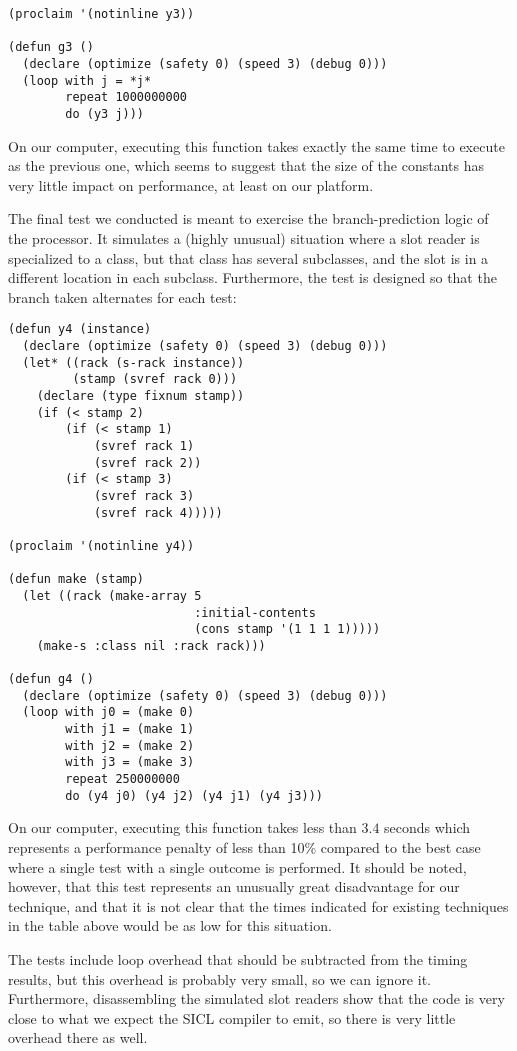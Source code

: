 {{\begin{verbatim}
(proclaim '(notinline y3))

(defun g3 ()
  (declare (optimize (safety 0) (speed 3) (debug 0)))
  (loop with j = *j*
        repeat 1000000000
        do (y3 j)))
\end{verbatim}}

On our computer, executing this function takes exactly the same time to
execute as the previous one, which seems to suggest that the size of
the constants has very little impact on performance, at least on our
platform.

The final test we conducted is meant to exercise the branch-prediction
logic of the processor.  It simulates a (highly unusual) situation
where a slot reader is specialized to a class, but that class has
several subclasses, and the slot is in a different location in each
subclass.  Furthermore, the test is designed so that the branch taken
alternates for each test:

{\small\begin{verbatim}
(defun y4 (instance)
  (declare (optimize (safety 0) (speed 3) (debug 0)))
  (let* ((rack (s-rack instance))
         (stamp (svref rack 0)))
    (declare (type fixnum stamp))
    (if (< stamp 2)
        (if (< stamp 1)
            (svref rack 1)
            (svref rack 2))
        (if (< stamp 3)
            (svref rack 3)
            (svref rack 4)))))

(proclaim '(notinline y4))

(defun make (stamp)
  (let ((rack (make-array 5
                          :initial-contents
                          (cons stamp '(1 1 1 1)))))
    (make-s :class nil :rack rack)))

(defun g4 ()
  (declare (optimize (safety 0) (speed 3) (debug 0)))
  (loop with j0 = (make 0)
        with j1 = (make 1)
        with j2 = (make 2)
        with j3 = (make 3)
        repeat 250000000
        do (y4 j0) (y4 j2) (y4 j1) (y4 j3)))
\end{verbatim}}

On our computer, executing this function takes less than $3.4$ seconds
which represents a performance penalty of less than 10\% compared to
the best case where a single test with a single outcome is performed.
It should be noted, however, that this test represents an unusually
great disadvantage for our technique, and that it is not clear that
the times indicated for existing techniques in the table above would
be as low for this situation.

The tests include loop overhead that should be subtracted from the
timing results, but this overhead is probably very small, so we can
ignore it.  Furthermore, disassembling the simulated slot readers show
that the code is very close to what we expect the SICL compiler to
emit, so there is very little overhead there as well.  

}
